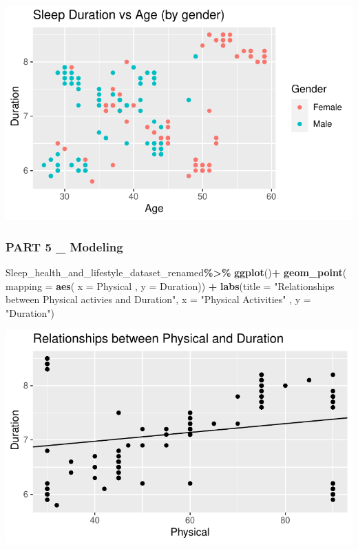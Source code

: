 \documentclass[
  11pt,
]{article}
\newenvironment{Shaded}{\begin{snugshade}}{\end{snugshade}}
\newcommand{\AttributeTok}[1]{\textcolor[rgb]{0.13,0.29,0.53}{#1}}
\newcommand{\FunctionTok}[1]{\textcolor[rgb]{0.13,0.29,0.53}{\textbf{#1}}}
\newcommand{\NormalTok}[1]{#1}
\newcommand{\SpecialCharTok}[1]{\textcolor[rgb]{0.81,0.36,0.00}{\textbf{#1}}}
\newcommand{\StringTok}[1]{\textcolor[rgb]{0.31,0.60,0.02}{#1}}
\begin{document}
\begin{center}\includegraphics[width=0.7\linewidth]{SleepHelath_files/figure-latex/unnamed-chunk-29-1} \end{center}

\hypertarget{part-5-_-modeling}{%
\subsubsection{PART 5 \_ Modeling}\label{part-5-_-modeling}}

\begin{Shaded}
\begin{Highlighting}[]
\NormalTok{Sleep\_health\_and\_lifestyle\_dataset\_renamed}\SpecialCharTok{\%\textgreater{}\%}
  \FunctionTok{ggplot}\NormalTok{()}\SpecialCharTok{+}
  \FunctionTok{geom\_point}\NormalTok{( }\AttributeTok{mapping =} \FunctionTok{aes}\NormalTok{( }\AttributeTok{x  =}\NormalTok{ Physical , }\AttributeTok{y =}\NormalTok{ Duration)) }\SpecialCharTok{+}
  \FunctionTok{labs}\NormalTok{(}\AttributeTok{title =} \StringTok{"Relationships between Physical activies and Duration"}\NormalTok{,}
       \AttributeTok{x =} \StringTok{"Physical Activities"}\NormalTok{ , }\AttributeTok{y =} \StringTok{"Duration"}\NormalTok{)}
\end{Highlighting}
\end{Shaded}

\begin{center}\includegraphics[width=0.7\linewidth]{SleepHelath_files/figure-latex/unnamed-chunk-30-1} \end{center}
\end{document}
